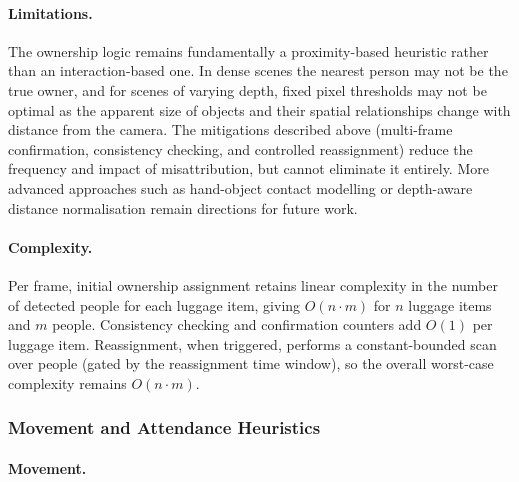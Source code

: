 \paragraph{Limitations.}

The ownership logic remains fundamentally a proximity-based heuristic rather
than an interaction-based one. In dense scenes the nearest person may not be
the true owner, and for scenes of varying depth, fixed pixel thresholds may not
be optimal as the apparent size of objects and their spatial relationships
change with distance from the camera. The mitigations described above
(multi-frame confirmation, consistency checking, and controlled reassignment)
reduce the frequency and impact of misattribution, but cannot eliminate it
entirely. More advanced approaches such as hand-object contact modelling or
depth-aware distance normalisation remain directions for future work.

\paragraph{Complexity.}

Per frame, initial ownership assignment retains linear complexity in the number
of detected people for each luggage item, giving $O(n \cdot m)$ for $n$ luggage
items and $m$ people. Consistency checking and confirmation counters add $O(1)$
per luggage item. Reassignment, when triggered, performs a constant-bounded
scan over people (gated by the reassignment time window), so the overall
worst-case complexity remains $O(n \cdot m)$.

\subsubsection{Movement and Attendance Heuristics}

\paragraph{Movement.}

